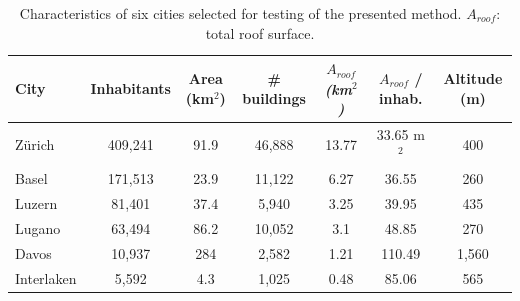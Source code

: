 \begin{table}[tb]
\centering
\footnotesize
\caption{Characteristics of six cities selected for testing of the presented method. $A_\mathit{roof}$: total roof surface.}
\label{tab:chile_cities}
\begin{tabular}{lcccccc}
\hline
\textbf{City} & \textbf{Inhabitants} & \textbf{Area (km$^2$)} & \textbf{\# buildings} & \textit{\textbf{$A_\mathit{roof}$ (km$^2$)}} & \textbf{$A_\mathit{roof}$ / inhab.} & \textbf{Altitude (m)} \\ \hline
Zürich        & 409,241              & 91.9                & 46,888                & 13.77                         & 33.65 m$^2$                & 400                   \\
Basel         & 171,513              & 23.9                & 11,122                & 6.27                          & 36.55                   & 260                   \\
Luzern        & 81,401               & 37.4                & 5,940                 & 3.25                          & 39.95                   & 435                   \\
Lugano        & 63,494               & 86.2                & 10,052                & 3.1                           & 48.85                   & 270                   \\
Davos         & 10,937               & 284                 & 2,582                 & 1.21                          & 110.49                  & 1,560                 \\
Interlaken    & 5,592                & 4.3                 & 1,025                 & 0.48                          & 85.06                   & 565                   \\ \hline
\end{tabular}
\end{table}


